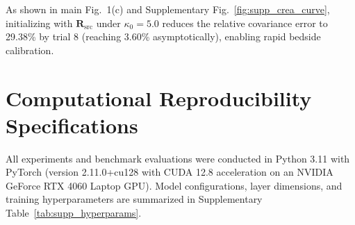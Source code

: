 \documentclass[journal]{IEEEtran}
\begin{document}
As shown in main Fig.~1(c) and Supplementary Fig.~\ref{fig:supp_crea_curve}, initializing with $\mathbf{R}_{\mathrm{src}}$ under $\kappa_0 = 5.0$ reduces the relative covariance error to 29.38\% by trial 8 (reaching 3.60\% asymptotically), enabling rapid bedside calibration.

\section{Computational Reproducibility Specifications}
\label{sec:supp_repro}

All experiments and benchmark evaluations were conducted in Python 3.11 with PyTorch (version 2.11.0+cu128 with CUDA 12.8 acceleration on an NVIDIA GeForce RTX 4060 Laptop GPU). Model configurations, layer dimensions, and training hyperparameters are summarized in Supplementary Table~\ref{tab:supp_hyperparams}.
\end{document}
